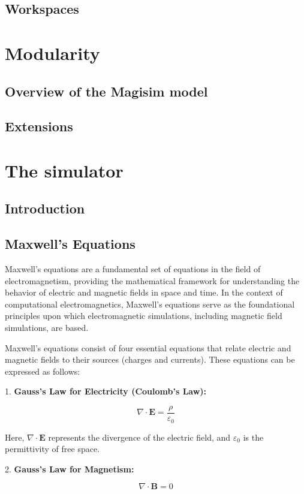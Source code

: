 \documentclass[11pt, a4paper, titlepage]{article}
\begin{document}
\subsection{Workspaces}

\section{Modularity}
\subsection{Overview of the Magisim model}
\subsection{Extensions}
\newpage
\section{The simulator}
\subsection{Introduction}
\newpage
\subsection{Maxwell's Equations}

Maxwell's equations are a fundamental set of equations in the field of electromagnetism, providing the mathematical framework for understanding the behavior of electric and magnetic fields in space and time. In the context of computational electromagnetics, Maxwell's equations serve as the foundational principles upon which electromagnetic simulations, including magnetic field simulations, are based.


Maxwell's equations consist of four essential equations that relate electric and magnetic fields to their sources (charges and currents). These equations can be expressed as follows:

1. \textbf{Gauss's Law for Electricity (Coulomb's Law):}

\[
\nabla \cdot \mathbf{E} = \frac{\rho}{\varepsilon_0}
\]

Here, \(\nabla \cdot \mathbf{E}\) represents the divergence of the electric field, and \(\varepsilon_0\) is the permittivity of free space.

2. \textbf{Gauss's Law for Magnetism:}

\[
\nabla \cdot \mathbf{B} = 0
\]
\end{document}
